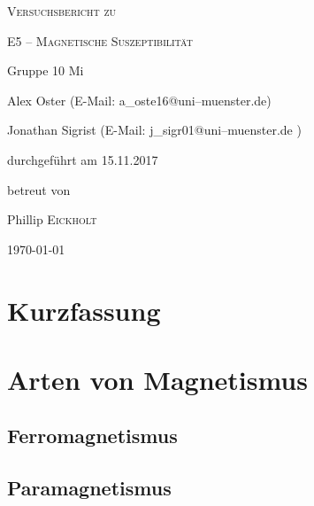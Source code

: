 \documentclass[11pt,a4paper,titlepage, ngerman]{article}
\begin{document}
	\begin{titlepage}
		\centering
		{\scshape\LARGE Versuchsbericht zu \par}
		\vspace{1cm}
		{\scshape\huge E5 -- Magnetische Suszeptibilität\par}
		\vspace{2.5cm}
		{\LARGE Gruppe 10 Mi\par}
		\vspace{0.5cm}
		{\large Alex Oster (E-Mail: a\_oste16@uni--muenster.de) \par}
		{\large Jonathan Sigrist (E-Mail: j\_sigr01@uni--muenster.de ) \par}
		\vfill
		durchgeführt am 15.11.2017\par
		betreut von\par
		{\large Phillip \textsc{Eickholt}}		
		\vfill	
		{\large \today\par}
	\end{titlepage}
		
	\tableofcontents
		
	\newpage
	
	\section{Kurzfassung}
		
		

	\newpage	
	\section{Arten von Magnetismus}
				
		
		
		\subsection{Ferromagnetismus}
		
			
		
		\subsection{Paramagnetismus}
			
			
\end{document}
